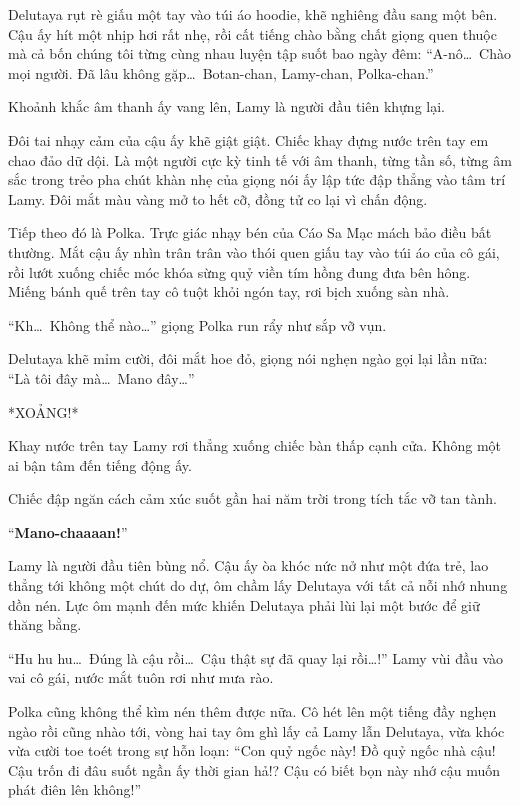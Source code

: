 \documentclass[../main.tex]{subfiles}
\begin{document}
Delutaya rụt rè giấu một tay vào túi áo hoodie, khẽ nghiêng đầu sang một bên. Cậu ấy hít một nhịp hơi rất nhẹ, rồi cất tiếng chào bằng chất giọng quen thuộc mà cả bốn chúng tôi từng cùng nhau luyện tập suốt bao ngày đêm: ``A-nô\dots\ Chào mọi người. Đã lâu không gặp\dots\ Botan-chan, Lamy-chan, Polka-chan.''

Khoảnh khắc âm thanh ấy vang lên, Lamy là người đầu tiên khựng lại.

Đôi tai nhạy cảm của cậu ấy khẽ giật giật. Chiếc khay đựng nước trên tay em chao đảo dữ dội. Là một người cực kỳ tinh tế với âm thanh, từng tần số, từng âm sắc trong trẻo pha chút khàn nhẹ của giọng nói ấy lập tức đập thẳng vào tâm trí Lamy. Đôi mắt màu vàng mở to hết cỡ, đồng tử co lại vì chấn động.

Tiếp theo đó là Polka. Trực giác nhạy bén của Cáo Sa Mạc mách bảo điều bất thường. Mắt cậu ấy nhìn trân trân vào thói quen giấu tay vào túi áo của cô gái, rồi lướt xuống chiếc móc khóa sừng quỷ viền tím hồng đung đưa bên hông. Miếng bánh quế trên tay cô tuột khỏi ngón tay, rơi bịch xuống sàn nhà.

``Kh\dots\ Không thể nào\dots'' giọng Polka run rẩy như sắp vỡ vụn.

Delutaya khẽ mỉm cười, đôi mắt hoe đỏ, giọng nói nghẹn ngào gọi lại lần nữa: ``Là tôi đây mà\dots\ Mano đây\dots''

*XOẢNG!*

Khay nước trên tay Lamy rơi thẳng xuống chiếc bàn thấp cạnh cửa. Không một ai bận tâm đến tiếng động ấy.

Chiếc đập ngăn cách cảm xúc suốt gần hai năm trời trong tích tắc vỡ tan tành.

``\textbf{Mano-chaaaan!}''

Lamy là người đầu tiên bùng nổ. Cậu ấy òa khóc nức nở như một đứa trẻ, lao thẳng tới không một chút do dự, ôm chầm lấy Delutaya với tất cả nỗi nhớ nhung dồn nén. Lực ôm mạnh đến mức khiến Delutaya phải lùi lại một bước để giữ thăng bằng.

``Hu hu hu\dots\ Đúng là cậu rồi\dots\ Cậu thật sự đã quay lại rồi\dots!'' Lamy vùi đầu vào vai cô gái, nước mắt tuôn rơi như mưa rào.

Polka cũng không thể kìm nén thêm được nữa. Cô hét lên một tiếng đầy nghẹn ngào rồi cũng nhào tới, vòng hai tay ôm ghì lấy cả Lamy lẫn Delutaya, vừa khóc vừa cười toe toét trong sự hỗn loạn: ``Con quỷ ngốc này! Đồ quỷ ngốc nhà cậu! Cậu trốn đi đâu suốt ngần ấy thời gian hả!? Cậu có biết bọn này nhớ cậu muốn phát điên lên không!''
\end{document}

